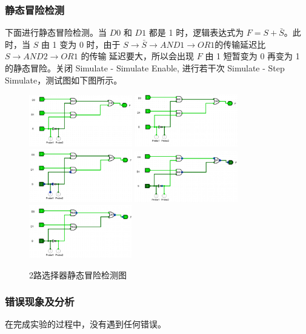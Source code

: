 \documentclass{article}
\begin{document}
    \subsubsection{静态冒险检测}
    下面进行静态冒险检测。当 $D0$ 和 $D1$ 都是 1 时，逻辑表达式为 $F = S + \bar{S} $。此时，当
    $S$ 由 1 变为 0 时，由于 $S → \bar{S}  → AND1 → OR1 $的传输延迟比 $S → AND2 → OR1$ 的传输
    延迟要大，所以会出现 $F$ 由 1 短暂变为 0 再变为 1 的静态冒险。关闭 Simulate - Simulate
    Enable, 进行若干次 Simulate - Step Simulate，测试图如下图所示。
    \begin{figure}[H]
        \centering
        \includegraphics[width=0.4\textwidth]{3.6.1.png}
        \includegraphics[width=0.4\textwidth]{3.6.2.png}
        \includegraphics[width=0.4\textwidth]{3.6.3.png}
        \includegraphics[width=0.4\textwidth]{3.6.4.png}
        \includegraphics[width=0.4\textwidth]{3.6.5.png}
    \caption{2路选择器静态冒险检测图}
    \end{figure}
    \subsubsection{错误现象及分析}
    在完成实验的过程中，没有遇到任何错误。
\end{document}
